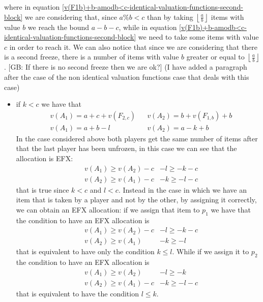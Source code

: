 \documentclass{article}
\newcommand{\gb}[1]{{\color{red}[GB: #1]}}
\begin{document}
where in equation \ref{v(F1b)+b-amodb<c-identical-valuation-functions-second-block} we are considering that, since $a\% b < c$ than by taking $\left\lfloor\frac{a}{b}\right\rfloor$ items with value $b$ we reach the bound $a-b-c$, while in equation \ref{v(F1b)+b-amodb<c-identical-valuation-functions-second-block} we need to take some items with value $c$ in order to reach it. We can also notice that since we are considering that there is a second freeze, there is a number of items with value $b$ greater or equal to $\left\lfloor\frac{a}{b}\right\rfloor$. 
\gb{If there is no second freeze then we are ok?} (I have added a paragraph after the case of the non identical valuation functions case that deals with this case)
\begin{itemize}
    \item if $k < c$ we have that
    \begin{align*}
        &v(A_1) = a + c + v(F_{2,c}) && v(A_2) = b + v(F_{1,b}) + b\\
        &v(A_1) = a + b-l && v(A_2) = a - k + b
    \end{align*}
    In the case considered above both players get the same number of items after that the last player has been unfrozen, in this case we can see that the allocation is EFX: 
    \begin{align*}
        &v(A_1) \ge v(A_2) -c & -l \ge - k - c\\
        &v(A_2) \ge v(A_1) -c & -k \ge -l -c
    \end{align*}
    that is true since $k<c$ and $l<c$.
    Instead in the case in which we have an item that is taken by a player and not by the other, by assigning it correctly, we can obtain an EFX allocation: if we assign that item to $p_1$ we have that the condition to have an EFX allocation is
    \begin{align*}
        &v(A_1) \ge v(A_2) -c & -l \ge - k - c\\
        &v(A_2) \ge v(A_1) & -k \ge -l 
    \end{align*}
    that is equivalent to have only the condition $k\le l$.
    While if we assign it to $p_2$ the condition to have an EFX allocation is
    \begin{align*}
        &v(A_1) \ge v(A_2) & -l \ge - k\\
        &v(A_2) \ge v(A_1)-c & -k \ge -l -c
    \end{align*}
    that is equivalent to have the condition $l\le k$.
    

\end{itemize}
\end{document}
